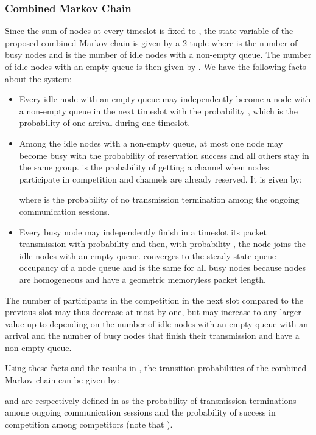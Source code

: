 \documentclass[12pt,journal,oneside,onecolumn]{IEEEtran}
\begin{document}
\subsubsection{Combined Markov Chain}
\label{subsub:combined}
Since the sum of nodes at every timeslot is fixed to , the state variable of the proposed combined Markov chain is given by a 2-tuple  
where  is the number of busy nodes and  is the number of idle nodes with a non-empty queue. 
The number of idle nodes with an empty queue is then given by . 
We have the following facts about the system:
\begin{itemize}
	\item Every idle node with an empty queue may independently become a node with a non-empty queue in the next timeslot 
with the probability , which is the probability of one arrival during one timeslot. 
	\item Among the idle nodes with a non-empty queue, at most one node may become busy with the probability of reservation success  and
all others stay in the same group.  is the probability of getting a channel when  nodes participate in competition and  channels are already reserved. It is given by:

where  is the probability of no transmission termination among the  ongoing communication sessions.
\item Every busy node may independently finish in a timeslot its packet transmission with  probability  and then, with probability , the node 
joins the idle nodes with an empty queue.  converges to the steady-state queue occupancy of a node queue and 
is the same for all busy nodes because nodes are homogeneous and have a geometric memoryless packet length. 
\end{itemize}
The number of participants in the competition in the next slot compared to the previous slot may thus decrease at most by one, 
but may increase to any larger value up to  depending on the number of idle nodes with an empty queue with an arrival and the number of busy nodes that finish
their transmission and have a non-empty queue.
	 	
Using these facts and the results in \cite[Eq. (16)]{pawelczak09}, the transition probabilities of the combined Markov chain can be given by:


\scriptsize

\normalsize
 and  are respectively defined in \cite [Eqs. (14),(15)]{pawelczak09} 
as the probability of  transmission terminations among  ongoing communication sessions 
and the probability of  success in competition among  competitors (note that ). 
\end{document}
